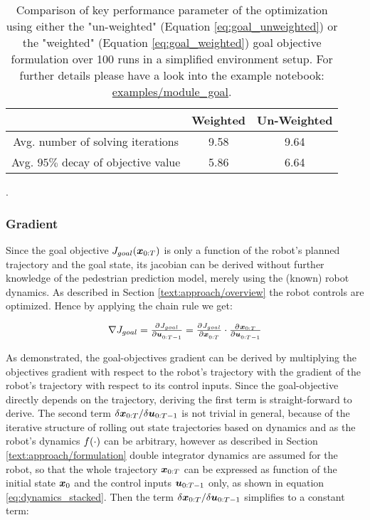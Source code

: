 \begin{table}[!ht]
\begin{center}
\begin{tabular}{c|c|c}
 & Weighted & Un-Weighted \\
\hline
Avg. number of solving iterations & 9.58 & 9.64 \\
\hline
Avg. $95 \%$ decay of objective value & 5.86 & 6.64 \\
\end{tabular}
\caption{Comparison of key performance parameter of the optimization using either the "un-weighted" (Equation \ref{eq:goal_unweighted}) or the "weighted" (Equation  \ref{eq:goal_weighted}) goal objective formulation over 100 runs in a simplified environment setup. For further details please have a look into the example notebook: \href{https://github.com/simon-schaefer/mantrap/blob/master/examples/modules/goal.ipynb}{examples/module_goal}.}.
\label{table:goal_horizon_weighting}
\end{center}
\end{table}

\subsubsection{Gradient}
Since the goal objective $J_{goal}(\boldsymbol{x}_{0:T})$ is only a function of the robot's planned trajectory and the goal state, its jacobian can be derived without further knowledge of the pedestrian prediction model, merely using the (known) robot dynamics. As described in Section \ref{text:approach/overview} the robot controls are optimized. Hence by applying the chain rule we get: 

\begin{equation}
\nabla J_{goal} = \pd{J_{goal}}{\u_{0:T-1}} = \pd{J_{goal}}{\x_{0:T}} \cdot \pd{\x_{0:T}}{\u_{0:T-1}}
\end{equation}

As demonstrated, the goal-objectives gradient can be derived by multiplying the objectives gradient with respect to the robot's trajectory with the gradient of the robot's trajectory with respect to its control inputs. Since the goal-objective directly depends on the trajectory, deriving the first term is straight-forward to derive. The second term $\delta \boldsymbol{x}_{0:T} / \delta \boldsymbol{u}_{0:T-1}$ is not trivial in general, because of the iterative structure of rolling out state trajectories based on dynamics and as the robot's dynamics $f(\cdot)$ can be arbitrary, however as described in Section \ref{text:approach/formulation} double integrator dynamics are assumed for the robot, so that the whole trajectory $\boldsymbol{x}_{0:T}$ can be expressed as function of the initial state $\boldsymbol{x}_0$ and the control inputs $\boldsymbol{u}_{0:T-1}$ only, as shown in equation \ref{eq:dynamics_stacked}. Then the term $\delta \boldsymbol{x}_{0:T} / \delta \boldsymbol{u}_{0:T-1}$ simplifies to a constant term:

